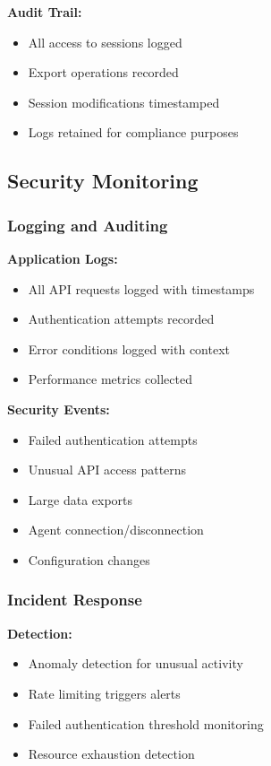 \textbf{Audit Trail:}
\begin{itemize}
    \item All access to sessions logged
    \item Export operations recorded
    \item Session modifications timestamped
    \item Logs retained for compliance purposes
\end{itemize}

\subsection{Security Monitoring}

\subsubsection{Logging and Auditing}

\textbf{Application Logs:}
\begin{itemize}
    \item All API requests logged with timestamps
    \item Authentication attempts recorded
    \item Error conditions logged with context
    \item Performance metrics collected
\end{itemize}

\textbf{Security Events:}
\begin{itemize}
    \item Failed authentication attempts
    \item Unusual API access patterns
    \item Large data exports
    \item Agent connection/disconnection
    \item Configuration changes
\end{itemize}

\subsubsection{Incident Response}

\textbf{Detection:}
\begin{itemize}
    \item Anomaly detection for unusual activity
    \item Rate limiting triggers alerts
    \item Failed authentication threshold monitoring
    \item Resource exhaustion detection
\end{itemize}


